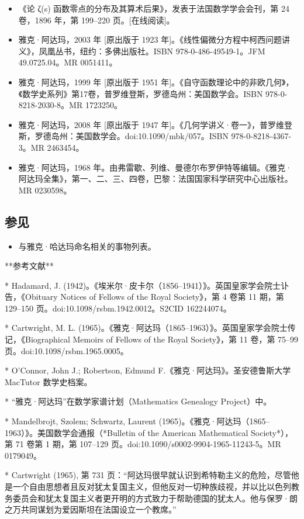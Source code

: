 \begin{itemize}
\item 《论 ζ(s) 函数零点的分布及其算术后果》，发表于法国数学学会会刊，第 24 卷，1896 年，第 199–220 页。[在线阅读]。
\item 雅克·阿达玛，2003 年 [原出版于 1923 年]。《线性偏微分方程中柯西问题讲义》，凤凰丛书，纽约：多佛出版社。ISBN 978-0-486-49549-1。JFM 49.0725.04。MR 0051411。
\item 雅克·阿达玛，1999 年 [原出版于 1951 年]。《自守函数理论中的非欧几何》，《数学史系列》第17卷，普罗维登斯，罗德岛州：美国数学会。ISBN 978-0-8218-2030-8。MR 1723250。
\item 雅克·阿达玛，2008 年 [原出版于 1947 年]。《几何学讲义·卷一》，普罗维登斯，罗德岛州：美国数学会。doi:10.1090/mbk/057。ISBN 978-0-8218-4367-3。MR 2463454。
\item 雅克·阿达玛，1968 年。由弗雷歇、列维、曼德尔布罗伊特等编辑。《雅克·阿达玛全集》，第一、二、三、四卷，巴黎：法国国家科学研究中心出版社。MR 0230598。
\end{itemize}
\subsection{参见}
\begin{itemize}
\item 与雅克·哈达玛命名相关的事物列表。
\end{itemize}


**参考文献**

* Hadamard, J. (1942)。《埃米尔·皮卡尔（1856–1941）》。英国皇家学会院士讣告，《Obituary Notices of Fellows of the Royal Society》，第 4 卷第 11 期，第 129–150 页。doi:10.1098/rsbm.1942.0012。S2CID 162244074。

* Cartwright, M. L. (1965)。《雅克·阿达玛（1865–1963）》。英国皇家学会院士传记，《Biographical Memoirs of Fellows of the Royal Society》，第 11 卷，第 75–99 页。doi:10.1098/rsbm.1965.0005。

* O'Connor, John J.; Robertson, Edmund F.《雅克·阿达玛》。圣安德鲁斯大学 MacTutor 数学史档案。

* “雅克·阿达玛”在数学家谱计划（Mathematics Genealogy Project）中。

* Mandelbrojt, Szolem; Schwartz, Laurent (1965)。《雅克·阿达玛（1865–1963）》。美国数学会通报（*Bulletin of the American Mathematical Society*），第 71 卷第 1 期，第 107–129 页。doi:10.1090/s0002-9904-1965-11243-5。MR 0179049。

* Cartwright (1965), 第 731 页：“阿达玛很早就认识到希特勒主义的危险，尽管他是一个自由思想者且反对犹太复国主义，但他反对一切种族歧视，并以比以色列教务委员会和犹太复国主义者更开明的方式致力于帮助德国的犹太人。他与保罗·朗之万共同谋划为爱因斯坦在法国设立一个教席。”

